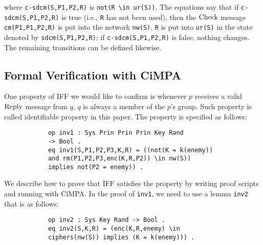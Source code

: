 \documentclass[10pt, conference, compsocconf]{IEEEtran}
\begin{document}
	\noindent
	where \verb!c-sdcm(S,P1,P2,R)! is \verb!not(R \in ur(S))!.
	The equations say that if \verb!c-sdcm(S,P1,P2,R)! is true (i.e., \verb!R! has not been used), then the $\rm Check$ message \verb!cm(P1,P1,P2,R)! is put into the network \verb!nw(S)!, \verb!R! is put into \verb!ur(S)! in the state denoted by \verb!sdcm(S,P1,P2,R)!; if \verb!c-sdcm(S,P1,P2,R)! is false, nothing changes. 
	The remaining transitions can be defined likewise.
	
	\subsection{Formal Verification with CiMPA}
	One property of IFF we would like to confirm is whenever $p$ receives a valid $\rm Reply$ message from $q$, $q$ is always a member of the $p$'s group. Such property is called identifiable property in this paper. The property is specified as follows:  
	
	\begin{small}
		\begin{verbatim}
			op inv1 : Sys Prin Prin Prin Key Rand 
			-> Bool .
			eq inv1(S,P1,P2,P3,K,R) = ((not(K = k(enemy))
			and rm(P1,P2,P3,enc(K,R,P2)) \in nw(S)) 
			implies not(P2 = enemy)) .
		\end{verbatim}
	\end{small}
	
	We describe how to prove that IFF satisfies the property by writing proof scripts and running with CiMPA. In the proof of \verb!inv1!, we need to use a lemma \verb!inv2! that is as follows:
	\begin{small}
		\begin{verbatim}
			op inv2 : Sys Key Rand -> Bool .
			eq inv2(S,K,R) = (enc(K,R,enemy) \in 
			ciphers(nw(S)) implies (K = k(enemy))) .
		\end{verbatim}
	\end{small}
	
\end{document}
